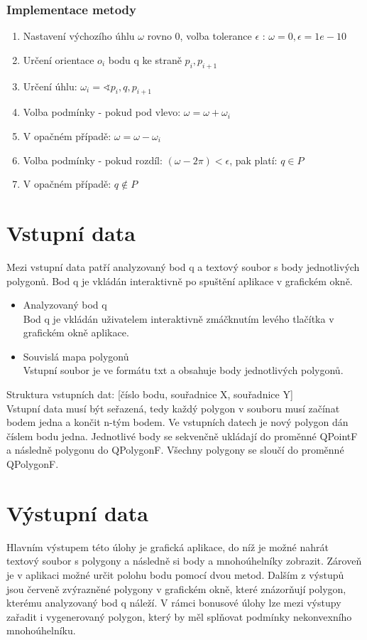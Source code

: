 \documentclass[a4paper, 12pt]{article}
\begin{document}
\subsubsection{Implementace metody}
\begin{enumerate}
\item Nastavení výchozího úhlu $\omega$ rovno 0, volba tolerance $\epsilon$ : $\omega = 0, \epsilon = 1e-10$
\item Určení orientace $o_i$ bodu q ke straně $p_i, p_{i+1}$
\item Určení úhlu: $\omega_i = \sphericalangle p_i, q, p_{i+1}$
\item Volba podmínky - pokud pod vlevo: $\omega = \omega + \omega_i$
\item V opačném případě: $\omega = \omega - \omega_i$
\item Volba podmínky - pokud rozdíl: $(\omega - 2\pi) < \epsilon$, pak platí: $q \in P$
\item V opačném případě:  $ q { \not \in } P $
\end{enumerate}

\section{Vstupní data}
Mezi vstupní data patří analyzovaný bod q a textový soubor s body jednotlivých polygonů. Bod q je vkládán interaktivně po spuštění aplikace v grafickém okně. 
\\
\begin{itemize}
\item Analyzovaný bod q\\
Bod q je vkládán uživatelem interaktivně zmáčknutím levého tlačítka v grafickém okně aplikace.

\item Souvislá mapa polygonů\\
Vstupní soubor je ve formátu txt a obsahuje body jednotlivých polygonů.
\end{itemize}


Struktura vstupních dat:
[číslo bodu, souřadnice X, souřadnice Y]\\

Vstupní data musí být seřazená, tedy každý polygon v souboru musí začínat bodem jedna a končit n-tým bodem.  Ve vstupních datech je nový polygon dán číslem bodu jedna. Jednotlivé body se sekvenčně ukládají do proměnné QPointF a následně polygonu do QPolygonF. Všechny polygony se sloučí do proměnné  QPolygonF.

\section{Výstupní data}
Hlavním výstupem této úlohy je grafická aplikace, do níž je možné nahrát textový soubor s polygony a následně si body a mnohoúhelníky zobrazit. Zároveň je v aplikaci možné určit polohu bodu pomocí dvou metod. Dalším z výstupů jsou červeně zvýrazněné polygony v grafickém okně, které znázorňují polygon, kterému analyzovaný bod q náleží. V rámci bonusové úlohy lze mezi výstupy zařadit i vygenerovaný polygon, který by měl splňovat podmínky nekonvexního mnohoúhelníku. 
\\
\end{document}
